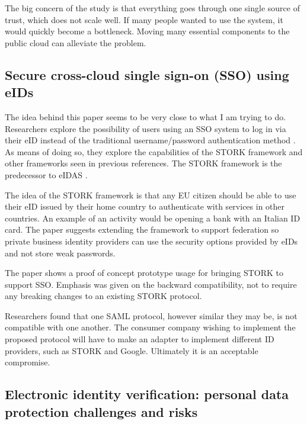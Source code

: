 The big concern of the study is that everything goes through one single source of trust, which does not scale well. If many people wanted to use the system, it would quickly become a bottleneck. Moving many essential components to the public cloud can alleviate the problem.

\subsection{Secure cross-cloud single sign-on (SSO) using eIDs}

The idea behind this paper seems to be very close to what I am trying to do. Researchers explore the possibility of users using an SSO system to log in via their eID instead of the traditional username/password authentication method \cite{secure-signon}. As means of doing so, they explore the capabilities of the STORK framework and other frameworks seen in previous references. The STORK framework is the predecessor to eIDAS \cite{stork}.

The idea of the STORK framework is that any EU citizen should be able to use their eID issued by their home country to authenticate with services in other countries. An example of an activity would be opening a bank with an Italian ID card. The paper suggests extending the framework to support federation so private business identity providers can use the security options provided by eIDs and not store weak passwords.

The paper shows a proof of concept prototype usage for bringing STORK to support SSO. Emphasis was given on the backward compatibility, not to require any breaking changes to an existing STORK protocol.

Researchers found that one SAML protocol, however similar they may be, is not compatible with one another. The consumer company wishing to implement the proposed protocol will have to make an adapter to implement different ID providers, such as STORK and Google. Ultimately it is an acceptable compromise.

\subsection{Electronic identity verification: personal data protection challenges and risks}

